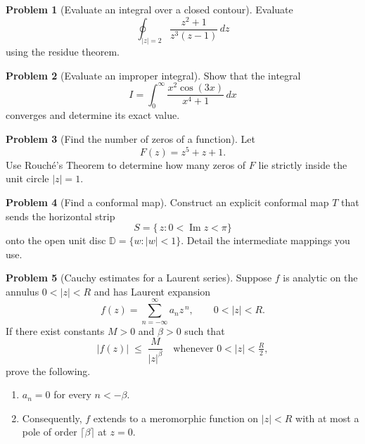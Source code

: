 \documentclass[12pt]{article}
\theoremstyle{definition} %
\newtheorem{problem}{Problem}
\theoremstyle{plain} %
\begin{document}
  \pagebreak
  
  \begin{problem}[Evaluate an integral over a closed contour]
  Evaluate
  \[
    \oint_{\lvert z\rvert = 2}
    \frac{z^{2}+1}{z^{3}(z-1)}\,dz
  \]
  using the residue theorem.
  \end{problem}
  
  \pagebreak
  
  \begin{problem}[Evaluate an improper integral]
  Show that the integral
  \[
    I=\int_{0}^{\infty}\frac{x^{2}\cos(3x)}{x^{4}+1}\,dx
  \]
  converges and determine its exact value.
  \end{problem}
  
  \pagebreak
  
  \begin{problem}[Find the number of zeros of a function]
  Let
  \[
    F(z)=z^{5}+z+1.
  \]
  Use Rouché’s Theorem to determine how many zeros of $F$ lie strictly inside the unit circle $\lvert z\rvert=1$.
  \end{problem}
  
  \pagebreak
  
  \begin{problem}[Find a conformal map]
  Construct an explicit conformal map \(T\) that sends the horizontal strip
  \[
    S=\bigl\{\,z : 0<\operatorname{Im}z<\pi\bigr\}
  \]
  onto the open unit disc \(\mathbb{D}=\{w:\lvert w\rvert<1\}\).  
  Detail the intermediate mappings you use.
  \end{problem}
  
  \pagebreak
  
  \begin{problem}[Cauchy estimates for a Laurent series]
  Suppose \(f\) is analytic on the annulus \(0<\lvert z\rvert<R\) and has Laurent expansion
  \[
    f(z)=\sum_{n=-\infty}^{\infty}a_{n}z^{\,n},\qquad 0<\lvert z\rvert<R.
  \]
  If there exist constants \(M>0\) and \(\beta>0\) such that
  \[
    \lvert f(z)\rvert\;\le\;\frac{M}{\lvert z\rvert^{\beta}}
    \quad\text{whenever }0<\lvert z\rvert<\tfrac{R}{2},
  \]
  prove the following.
  \begin{enumerate}[label=(\alph*),itemsep=6pt]
    \item \(a_{n}=0\) for every \(n<-\beta\).
    \item Consequently, \(f\) extends to a meromorphic function on \(\lvert z\rvert<R\) with at most a pole of order \(\lceil\beta\rceil\) at \(z=0\).
  \end{enumerate}
  \end{problem}
\end{document}
